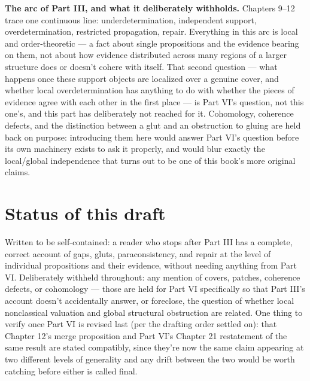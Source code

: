 \textbf{The arc of Part III, and what it deliberately withholds.} Chapters
9--12 trace one continuous line: underdetermination, independent support,
overdetermination, restricted propagation, repair. Everything in this
arc is local and order-theoretic --- a fact about single propositions and
the evidence bearing on them, not about how evidence distributed across
many regions of a larger structure does or doesn't cohere with itself.
That second question --- what happens once these support objects are
localized over a genuine cover, and whether local overdetermination has
anything to do with whether the pieces of evidence agree with each other
in the first place --- is Part VI's question, not this one's, and this
part has deliberately not reached for it. Cohomology, coherence defects,
and the distinction between a glut and an obstruction to gluing are held
back on purpose: introducing them here would answer Part VI's question
before its own machinery exists to ask it properly, and would blur
exactly the local/global independence that turns out to be one of this
book's more original claims.

\hypertarget{status-of-this-draft}{%
\section{Status of this draft}\label{status-of-this-draft}}

Written to be self-contained: a reader who stops after Part III has a
complete, correct account of gaps, gluts, paraconsistency, and repair at
the level of individual propositions and their evidence, without needing
anything from Part VI. Deliberately withheld throughout: any mention of
covers, patches, coherence defects, or cohomology --- those are held for
Part VI specifically so that Part III's account doesn't accidentally
answer, or foreclose, the question of whether local nonclassical
valuation and global structural obstruction are related. One thing to
verify once Part VI is revised last (per the drafting order settled on):
that Chapter 12's merge proposition and Part VI's Chapter 21 restatement
of the same result are stated compatibly, since they're now the same
claim appearing at two different levels of generality and any drift
between the two would be worth catching before either is called final.

